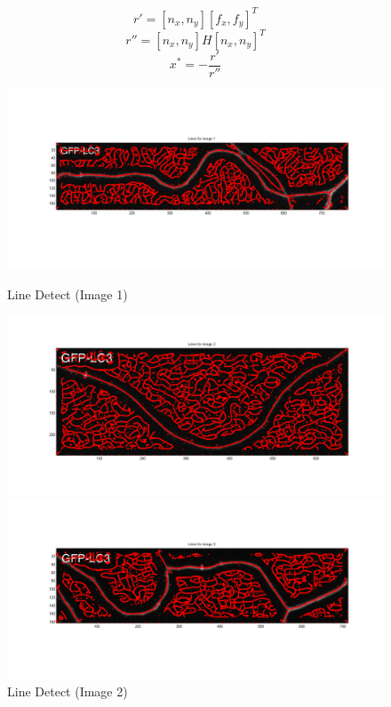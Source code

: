 \documentclass{article}
\begin{document}
\begin{equation}
r' = [n_x,n_y][f_x,f_y]^T
\label{eq:1_directional_derivative}
\end{equation}
\begin{equation}
r'' = [n_x,n_y]H[n_x,n_y]^T
\label{eq:2_directional_derivative}
\end{equation}
\begin{equation}
x^* = -\frac{r'}{r''}
\label{eq:local_intensity_max}
\end{equation}

\begin{figure}[h]
\begin{minipage}[b]{0.3\linewidth}
\centering
\includegraphics[width=\textwidth]{figures/line_detection_1.png}
\caption{Line Detect (Image 1)}
\label{fig:line_detect_1}
\end{minipage}
\hspace{0.5cm}
\begin{minipage}[b]{0.3\linewidth}
\centering
\includegraphics[width=\textwidth]{figures/line_detection_2.png}
\caption{Line Detect (Image 2)}
\label{fig:line_detect_2}
\end{minipage}
\begin{minipage}[b]{0.3\linewidth}
\centering
\includegraphics[width=\textwidth]{figures/line_detection_3.png}

\end{minipage}
\end{figure}
\end{document}
